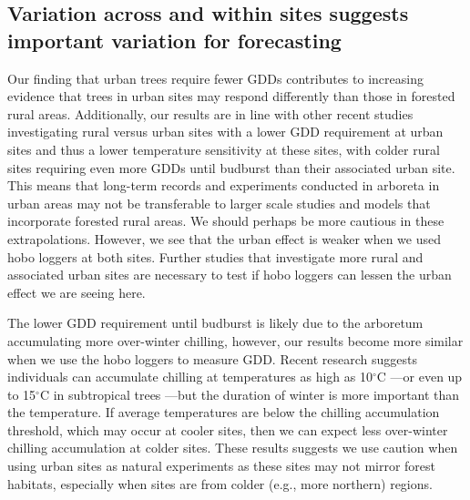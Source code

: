 \documentclass{article}\usepackage[]{graphicx}\usepackage[]{color}
\begin{document}
\subsection*{Variation across and within sites suggests important variation for forecasting} 
Our finding that urban trees require fewer GDDs contributes to increasing evidence that trees in urban sites may respond differently than those in forested rural areas. Additionally, our results are in line with other recent studies investigating rural versus urban sites with a lower GDD requirement at urban sites and thus a lower temperature sensitivity \citep{Meng2020} at these sites, with colder rural sites requiring even more GDDs until budburst than their associated urban site. This means that long-term records and experiments conducted in arboreta in urban areas may not be transferable to larger scale studies and models that incorporate forested rural areas. We should perhaps be more cautious in these extrapolations. However, we see that the urban effect is weaker when we used hobo loggers at both sites. Further studies that investigate more rural and associated urban sites are necessary to test if hobo loggers can lessen the urban effect we are seeing here.
  
The lower GDD requirement until budburst is likely due to the arboretum accumulating more over-winter chilling, however, our results become more similar when we use the hobo loggers to measure GDD. Recent research suggests individuals can accumulate chilling at temperatures as high as 10$^{\circ}$C \citep{Baumgarten2021}---or even up to 15$^{\circ}$C in subtropical trees \citep{Zhang2021}---but the duration of winter is more important than the temperature. If average temperatures are below the chilling accumulation threshold, which may occur at cooler sites, then we can expect less over-winter chilling accumulation at colder sites. These results suggests we use caution when using urban sites as natural experiments as these sites may not mirror forest habitats, especially when sites are from colder (e.g., more northern) regions.
  
\end{document}

